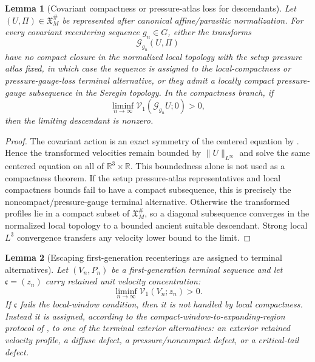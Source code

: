 \documentclass[11pt]{amsart}
\numberwithin{equation}{section}
\theoremstyle{plain}
\newtheorem{lemma}[lemma]{Lemma}
\theoremstyle{definition}
\theoremstyle{remark}
\newcommand{\Vel}{\mathcal V}
\begin{document}
\begin{lemma}[Covariant compactness or pressure-atlas loss for descendants]
\label{lem:ancient-profile-covariant-compactness}
Let \((U,\Pi)\in\mathfrak X_M^\#\) be represented after canonical
affine/parasitic normalization.  For every covariant recentering sequence
\(g_n\in G\), either the transforms
\[
   \mathscr G_{g_n}(U,\Pi)
\]
have no compact closure in the normalized local topology with the setup
pressure atlas fixed, in which case the sequence is assigned to the
local-compactness or pressure-gauge-loss terminal alternative, or they admit a
locally compact pressure-gauge subsequence in the Seregin topology.  In the
compactness branch, if
\[
   \liminf_{n\to\infty}\Vel_1(\mathscr G_{g_n}U;0)>0,
\]
then the limiting descendant is nonzero.
\end{lemma}

\begin{proof}
The covariant action is an exact symmetry of the centered equation by
.  Hence the transformed velocities remain
bounded by \(\|U\|_{L^\infty}\) and solve the same centered equation on all of
\(\mathbb R^3\times\mathbb R\).  This boundedness alone is not used as a
compactness theorem.  If the setup pressure-atlas representatives and local
compactness bounds fail to have a compact subsequence, this is precisely the
noncompact/pressure-gauge terminal alternative.  Otherwise the transformed
profiles lie in a compact subset of \(\mathfrak X_M^\#\), so a diagonal
subsequence converges in the normalized local topology to a bounded ancient
suitable descendant.  Strong local \(L^3\) convergence transfers any velocity
lower bound to the limit.
\end{proof}

\begin{lemma}[Escaping first-generation recenterings are assigned to terminal alternatives]
\label{lem:escaping-first-generation-alternatives}
Let \((V_n,P_n)\) be a first-generation terminal sequence and let
\(\mathfrak c=(z_n)\) carry retained unit velocity concentration:
\[
   \liminf_{n\to\infty}\Vel_1(V_n;z_n)>0 .
\]
If \(\mathfrak c\) fails the local-window condition, then it is not handled
by local compactness.  Instead it is assigned, according to the
compact-window-to-expanding-region protocol of
, to one of the terminal
exterior alternatives: an exterior retained velocity profile, a diffuse defect,
a pressure/noncompact defect, or a critical-tail defect.
\end{lemma}
\end{document}
